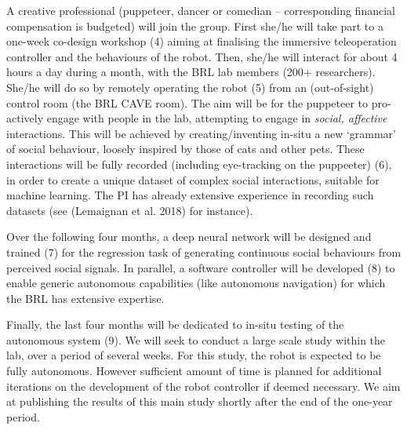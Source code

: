 \documentclass[11pt,a4paper]{report}
\begin{document}
A creative professional (puppeteer, dancer or comedian --
corresponding financial compensation is budgeted) will join the group.
First she/he will take part to a one-week co-design workshop (4) aiming
at finalising the immersive teleoperation controller and the behaviours
of the robot. Then, she/he will interact for about 4 hours a day during
a month, with the BRL lab members (200+ researchers). She/he will do so
by remotely operating the robot (5) from an (out-of-sight) control room
(the BRL CAVE room). The aim will be for the puppeteer to pro-actively
engage with people in the lab, attempting to engage in \emph{social,
affective} interactions. This will be achieved by creating/inventing
in-situ a new `grammar' of social behaviour, loosely inspired by those
of cats and other pets. These interactions will be fully recorded
(including eye-tracking on the puppeeter) (6), in order to create a
unique dataset of complex social interactions, suitable for machine
learning. The PI has already extensive experience in recording such
datasets (see (Lemaignan et al. 2018) for instance).


Over the following four months, a deep neural network will be designed
and trained (7) for the regression task of generating continuous social
behaviours from perceived social signals. In parallel, a software
controller will be developed (8) to enable generic autonomous
capabilities (like autonomous navigation) for which the BRL has
extensive expertise.

Finally, the last four months will be dedicated to in-situ testing of
the autonomous system (9). We will seek to conduct a large scale study
within the lab, over a period of several weeks. For this study, the
robot is expected to be fully autonomous. However sufficient amount of
time is planned for additional iterations on the development of the
robot controller if deemed necessary. We aim at publishing the results
of this main study shortly after the end of the one-year period.
\end{document}
